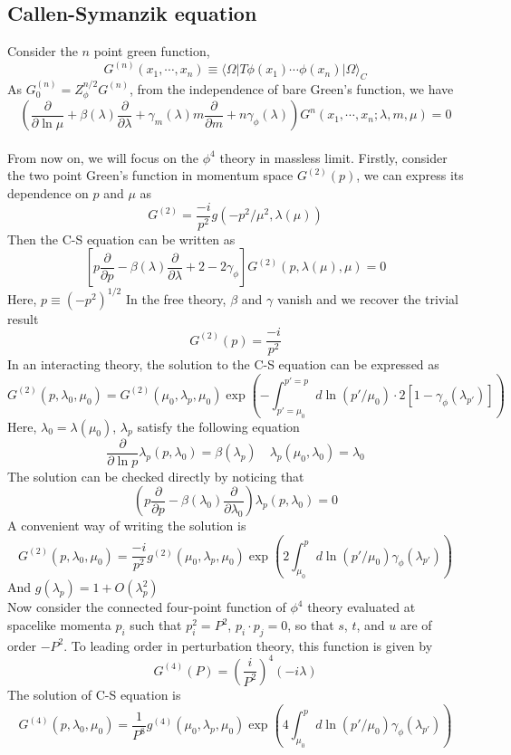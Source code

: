 \subsection{Callen-Symanzik equation}
Consider the $n$ point green function,
\[G^{(n)}(x_1,\cdots,x_n) \equiv \langle \Omega | T \phi(x_1) \cdots \phi(x_n) | \Omega \rangle_C \]
As $G^{(n)}_0 = Z_{\phi}^{n/2} G^{(n)}$, from the independence of bare Green's function, we have
\[\left( \frac{\partial}{\partial \ln \mu} + \beta(\lambda)  \frac{\partial}{\partial \lambda} + \gamma_m(\lambda) m  \frac{\partial}{\partial m} + n \gamma_{\phi}(\lambda)\right)G^{n}(x_1,\cdots,x_n;\lambda,m,\mu) = 0\]
\\
From now on, we will focus on the $\phi^4$ theory in massless limit. Firstly, consider the two point Green's function in momentum space $G^{(2)}(p)$, we can express its dependence on $p$ and $\mu$ as
\[G^{(2)} = \frac{-i}{p^2} g(-p^2/\mu^2,\lambda(\mu))\]
Then the C-S equation can be written as
\[\left[ p \frac{\partial}{\partial p} - \beta(\lambda)  \frac{\partial}{\partial \lambda} +2 - 2\gamma_{\phi}\right ] G^{(2)}(p,\lambda(\mu),\mu) = 0 \]
Here, $p \equiv (-p^2)^{1/2}$
In the free theory, $\beta$ and $\gamma$ vanish and we recover the trivial result
\[G^{(2)}(p) = \frac{-i}{p^2}\]
In an interacting theory, the solution to the C-S equation can be expressed as
\[G^{(2)}(p,\lambda_0,\mu_0) = G^{(2)}(\mu_0,\lambda_p,\mu_0)\exp \left (-\int_{p'=\mu_0}^{p'=p} d \ln(p'/\mu_0) \cdot 2[1-\gamma_{\phi}(\lambda_{p'})] \right )\]
Here, $\lambda_0 = \lambda(\mu_0)$, $\lambda_p$ satisfy the following equation
\[\frac{\partial}{\partial \ln p} \lambda_p(p,\lambda_0) = \beta(\lambda_p) \quad \lambda_p(\mu_0,\lambda_0) = \lambda_0\]
The solution can be checked directly by noticing that
\[\left ( p \frac{\partial}{\partial p} - \beta(\lambda_0) \frac{\partial}{\partial \lambda_0} \right ) \lambda_p(p,\lambda_0) = 0\]
A convenient way of writing the solution is
\[G^{(2)}(p,\lambda_0,\mu_0) =  \frac{-i}{p^2} g^{(2)}(\mu_0,\lambda_p,\mu_0)\exp \left (2\int_{\mu_0}^{p} d \ln(p'/\mu_0)  \gamma_{\phi}(\lambda_{p'}) \right )\]
And $g(\lambda_p) = 1 + O(\lambda_p^2)$
\\
Now consider the connected four-point function of $\phi^4$ theory evaluated at spacelike momenta $p_i$ such that $p_i^2= P^2$, $p_i \cdot p_j = 0$, so that $s$, $t$, and $u$ are of order $-P^2$. To leading order in perturbation theory, this function is given by
\[G^{(4)}(P) = \left (\frac{i}{P^2}\right )^4 (-i\lambda)\]
The solution of C-S equation is
\[G^{(4)}(p,\lambda_0,\mu_0) =  \frac{1}{P^8} g^{(4)}(\mu_0,\lambda_p,\mu_0)\exp \left (4\int_{\mu_0}^{p} d \ln(p'/\mu_0)  \gamma_{\phi}(\lambda_{p'}) \right )\]
